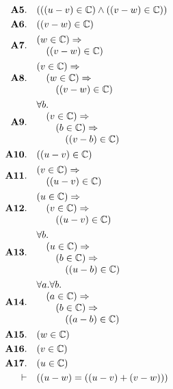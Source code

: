 \documentclass[11pt]{article}
\theoremstyle{plain}
\begin{document}
\begin{align*}
  \mathbf{A5.}\quad & (((u - v) \in \mathbb{C}) \wedge ((v - w) \in \mathbb{C})) \\
  \mathbf{A6.}\quad & ((v - w) \in \mathbb{C}) \\
  \mathbf{A7.}\quad & \begin{array}{@{}l@{}} (w \in \mathbb{C}) \Rightarrow  \\ \quad ((v - w) \in \mathbb{C}) \end{array} \\
  \mathbf{A8.}\quad & \begin{array}{@{}l@{}} (v \in \mathbb{C}) \Rightarrow  \\ \quad (w \in \mathbb{C}) \Rightarrow  \\ \quad \quad ((v - w) \in \mathbb{C}) \end{array} \\
  \mathbf{A9.}\quad & \begin{array}{@{}l@{}} \forall b. \\ \quad (v \in \mathbb{C}) \Rightarrow  \\ \quad \quad (b \in \mathbb{C}) \Rightarrow  \\ \quad \quad \quad ((v - b) \in \mathbb{C}) \end{array} \\
  \mathbf{A10.}\quad & ((u - v) \in \mathbb{C}) \\
  \mathbf{A11.}\quad & \begin{array}{@{}l@{}} (v \in \mathbb{C}) \Rightarrow  \\ \quad ((u - v) \in \mathbb{C}) \end{array} \\
  \mathbf{A12.}\quad & \begin{array}{@{}l@{}} (u \in \mathbb{C}) \Rightarrow  \\ \quad (v \in \mathbb{C}) \Rightarrow  \\ \quad \quad ((u - v) \in \mathbb{C}) \end{array} \\
  \mathbf{A13.}\quad & \begin{array}{@{}l@{}} \forall b. \\ \quad (u \in \mathbb{C}) \Rightarrow  \\ \quad \quad (b \in \mathbb{C}) \Rightarrow  \\ \quad \quad \quad ((u - b) \in \mathbb{C}) \end{array} \\
  \mathbf{A14.}\quad & \begin{array}{@{}l@{}} \forall a. \forall b. \\ \quad (a \in \mathbb{C}) \Rightarrow  \\ \quad \quad (b \in \mathbb{C}) \Rightarrow  \\ \quad \quad \quad ((a - b) \in \mathbb{C}) \end{array} \\
  \mathbf{A15.}\quad & (w \in \mathbb{C}) \\
  \mathbf{A16.}\quad & (v \in \mathbb{C}) \\
  \mathbf{A17.}\quad & (u \in \mathbb{C}) \\
  \vdash\quad & ((u - w) = ((u - v) + (v - w)))
\end{align*}
\end{document}
